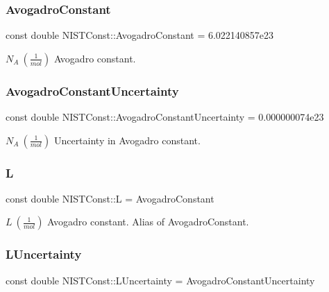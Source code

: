 \subsubsection{\texorpdfstring{Avogadro\+Constant}{AvogadroConstant}}
{\footnotesize\ttfamily const double N\+I\+S\+T\+Const\+::\+Avogadro\+Constant = 6.\+022140857e23}

$N_A \ (\frac{1}{mol})$ Avogadro constant. \mbox{\label{group___n_i_s_t_const-_avogadro_constant_ga38f3e71e31d844bbfe2dfacf7100c4d1}} 
\subsubsection{\texorpdfstring{Avogadro\+Constant\+Uncertainty}{AvogadroConstantUncertainty}}
{\footnotesize\ttfamily const double N\+I\+S\+T\+Const\+::\+Avogadro\+Constant\+Uncertainty = 0.\+000000074e23}

$N_A \ (\frac{1}{mol})$ Uncertainty in Avogadro constant. \mbox{\label{group___n_i_s_t_const-_avogadro_constant_ga0d410e47da7c9d6841958899d80e4b75}} 
\subsubsection{\texorpdfstring{L}{L}}
{\footnotesize\ttfamily const double N\+I\+S\+T\+Const\+::L = Avogadro\+Constant}

$L \ (\frac{1}{mol})$ Avogadro constant. Alias of Avogadro\+Constant. \mbox{\label{group___n_i_s_t_const-_avogadro_constant_ga76105d1e09dbaed0913932aa743ef03d}} 
\subsubsection{\texorpdfstring{L\+Uncertainty}{LUncertainty}}
{\footnotesize\ttfamily const double N\+I\+S\+T\+Const\+::\+L\+Uncertainty = Avogadro\+Constant\+Uncertainty}

